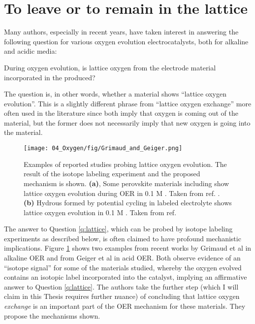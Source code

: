 

\section{To leave or to remain in the lattice}\label{sec:lattice_O}

Many authors, especially in recent years, have taken interest in answering the following question for various oxygen evolution electrocatalysts, both for alkaline and acidic media:
\begin{question}
During oxygen evolution, is lattice oxygen from the electrode material incorporated in the  produced? \label{q:lattice}
\end{question}
The question is, in other words, whether a material shows ``lattice oxygen evolution''. This is a slightly different phrase from ``lattice oxygen exchange'' more often used in the literature since both imply that oxygen is coming out of the material, but the former does not necessarily imply that new oxygen is going into the material.

\begin{figure}[b!]
	\centering
	\texttt{[image: 04\_Oxygen/fig/Grimaud\_and\_Geiger.png]}
	\caption{Examples of reported studies probing lattice oxygen evolution. The result of the isotope labeling experiment and the proposed mechanism is shown. \textbf{(a)}, Some perovskite materials including  show lattice oxygen evolution during OER in 0.1 M . Taken from ref. . \textbf{(b)} Hydrous  formed by potential cycling  in labeled electrolyte shows lattice oxygen evolution in 0.1 M . Taken from ref. }
	\label{fig:GG}
\end{figure}

The answer to Question \ref{q:lattice}, which can be probed by isotope labeling experiments as described below, is often claimed to have profound mechanistic implications. Figure \ref{fig:GG} shows two examples from recent works by Grimaud et al\cite{Grimaud2017} in alkaline OER and from Geiger et al\cite{Geiger2018} in acid OER. Both observe evidence of an ``isotope signal'' for some of the materials studied, whereby the oxygen evolved contains an isotopic label incorporated into the catalyst, implying an affirmative answer to Question \ref{q:lattice}. The authors take the further step (which I will claim in this Thesis requires further nuance) of concluding that lattice oxygen \textit{exchange} is an important part of the OER mechanism for these materials. They propose the mechanisms shown.

